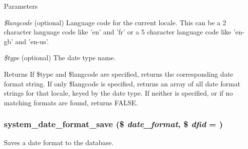 \begin{DoxyParams}{Parameters}
\item[{\em \$langcode}](optional) Language code for the current locale. This can be a 2 character language code like 'en' and 'fr' or a 5 character language code like 'en-\/gb' and 'en-\/us'. \item[{\em \$type}](optional) The date type name.\end{DoxyParams}
\begin{DoxyReturn}{Returns}
If \$type and \$langcode are specified, returns the corresponding date format string. If only \$langcode is specified, returns an array of all date format strings for that locale, keyed by the date type. If neither is specified, or if no matching formats are found, returns FALSE. 
\end{DoxyReturn}
\hypertarget{system_8module_a08b578d5998a5c83ece092e2fcbeb22f}{
\subsubsection[{system\_\-date\_\-format\_\-save}]{\setlength{\rightskip}{0pt plus 5cm}system\_\-date\_\-format\_\-save (\$ {\em date\_\-format}, \/  \$ {\em dfid} = {})}}
\label{system_8module_a08b578d5998a5c83ece092e2fcbeb22f}
Saves a date format to the database.


